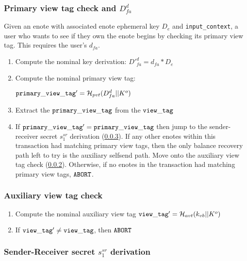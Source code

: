 \subsubsection{Primary view tag check and $D^d_{fa}$}
\label{subsubsec:jamtis-balance-recovery-view-tag-primary}

Given an enote with associated enote ephemeral key $D_e$ and {\tt input\_context}, a user who wants to see if they own the enote begins by checking its primary view tag. This requires the user's $d_{fa}$.

\begin{enumerate}
    \item Compute the nominal key derivation: $D'^d_{fa} = d_{fa} * D_e$

    \item Compute the nominal primary view tag:

    ${\tt primary\_view\_tag'} = \mathcal{H}_{pvt}(D^d_{fa} || K^o)$
    
    \item Extract the ${\tt primary\_view\_tag}$ from the ${\tt view\_tag}$

    \item If ${\tt primary\_view\_tag}' = {\tt primary\_view\_tag}$ then jump to the sender-receiver secret $s^{sr}_1$ derivation (\ref{subsubsec:jamtis-balance-recovery-sr1}). If any other enotes within this transaction had matching primary view tags, then the only balance recovery path left to try is the auxiliary selfsend path. Move onto the auxiliary view tag check (\ref{subsubsec:jamtis-balance-recovery-aux-check}). Otherwise, if no enotes in the transaction had matching primary view tags, ${\tt ABORT}$.
\end{enumerate}

\subsubsection{Auxiliary view tag check}
\label{subsubsec:jamtis-balance-recovery-aux-check}

\begin{enumerate}
    \item Compute the nominal auxiliary view tag ${\tt view\_tag'} = \mathcal{H}_{avt}(k_{vb} || K^o)$
    
    \item If ${\tt view\_tag'} \neq {\tt view\_tag}$, then ${\tt ABORT}$
\end{enumerate}

\subsubsection{Sender-Receiver secret $s^{sr}_1$ derivation}
\label{subsubsec:jamtis-balance-recovery-sr1}

